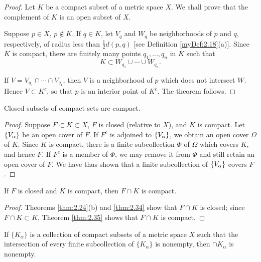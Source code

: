 \begin{proof}
    Let $K$ be a compact subset of a metric space $X$. 
    We shall prove that the complement of $K$ is an open subset of $X$.

    Suppose $p \in X$, $p \not\in K$. 
    If $q \in K$, let $V_q$ and $W_q$ be neighborhoods of $p$ and $q$, 
    respectively, of radius less than $\tfrac{1}{2}d(p, q)$ [see Definition \ref{myDef:2.18}(a)].
    Since $K$ is compact, there are finitely many points $q_1, ..., q_n$ in $K$ such that
    \begin{equation*}
        K \subset 
        W_{q_1} \cup \cdots \cup
        W_{q_n}. 
    \end{equation*}

    If $V=V_{q_1} \cap \cdots \cap V_{q_1}$, 
    then $V$ is a neighborhood of $p$ which does not intersect $W$. 
    Hence $V \subset K^c$, so that $p$ is an interior point of $K^c$.
    The theorem follows.
\end{proof}

\begin{thm}
    \label{thm:2.35}
    Closed subsets of compact sets are compact.
\end{thm}

\begin{proof}
    Suppose $F \subset K \subset X$, 
    $F$ is closed (relative to $X$), 
    and $K$ is compact. 
    Let $\protect\{V_\alpha\}$ be an open cover of $F$. 
    If $F^c$ is adjoined to $\protect\{V_\alpha\}$, 
    we obtain an open cover $\Omega$ of $K$. 
    Since $K$ is compact, there is a finite subcollection $\Phi$ of $\Omega$ which covers $K$, and hence $F$. 
    If $F^c$ is a member of $\Phi$, 
    we may remove it from $\Phi$ and still retain an open cover of $F$. 
    We have thus shown that a finite subcollection of $\protect\{V_\alpha\}$ covers $F$.
\end{proof}

\begin{myCorollary*}
    If $F$ is closed and $K$ is compact, then $F \cap K$ is compact.
\end{myCorollary*}

\begin{proof}
    Theorems \ref{thm:2.24}(b) and \ref{thm:2.34} show that $F \cap K$ is closed; 
    since $F \cap K \subset K$, 
    Theorem \ref{thm:2.35} shows that $F \cap K$ is compact.
\end{proof}

\begin{thm}
    \label{thm:2.36}
    If $\{K_\alpha\}$ is a collection of compact subsets of a metric space $X$ 
    such that the intersection of every finite subcollection of $\{K_\alpha\}$ is nonempty, 
    then $\cap K_\alpha$ is nonempty.    
\end{thm}

